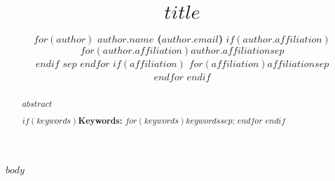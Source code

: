 \documentclass[10pt,letterpaper]{article}
\title{$title$}
\author{%
  $for(author)$
  {\large \bf $author.name$ ($author.email$)} %
  $if(author.affiliation)$\\    %
  $for(author.affiliation)$$author.affiliation$$sep$\\%
  $endif$ %
  $sep$\AND %
  $endfor$ %
  $if(affiliation)$             %
  $for(affiliation)$$affiliation$$sep$\\  %
  $endfor$
  $endif$%
}
\begin{document}
\maketitle


\begin{abstract}
  $abstract$
  
  $if(keywords)$\textbf{Keywords:} $for(keywords)$$keywords$$sep$; $endfor$ $endif$
\end{abstract}


$body$


% 


\printbibliography
\end{document}
